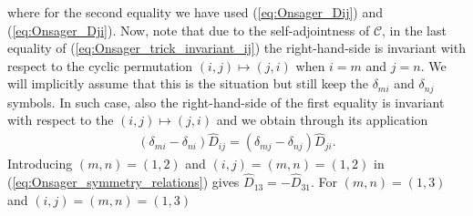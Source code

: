 where for the second equality we have used (\ref{eq:Onsager_Dij}) and (\ref{eq:Onsager_Dji}).
Now, note that due to the self-adjointness of $\mathcal{C}$, in the last equality of (\ref{eq:Onsager_trick_invariant_ij}) the right-hand-side is invariant with respect to the cyclic permutation $(i,j)\mapsto(j,i)$ when $i=m$ and $j=n$. We will implicitly assume that this is the situation but still keep the $\delta_{mi}$ and $\delta_{nj}$ symbols. In such case, also the right-hand-side of the first equality is invariant with respect to the $(i,j)\mapsto(j,i)$ and we obtain through its application
%
\begin{align}
	(\delta_{mi} - \delta_{ni})\widehat{D}_{ij}   = (\delta_{mj} - \delta_{nj})\widehat{D}_{ji} .
	\label{eq:Onsager_symmetry_relations} 
\end{align}
Introducing $(m,n)=(1,2)$ and $(i,j) =(m,n)=(1,2) $ in (\ref{eq:Onsager_symmetry_relations}) gives $\widehat{D}_{13} = - \widehat{D}_{31}$. For $(m,n)=(1,3)$ and $(i,j) =(m,n)=(1,3) $



